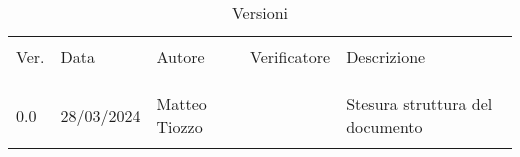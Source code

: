 \documentclass[italian,12pt]{article} %
\begin{document}


\newpage



\begin{table}[!h]
    \caption*{Versioni}
    \begin{center}
        \begin{tabular}{ l l l l p{9cm} }
            \hline                                                                                                          \\[-2ex]
            Ver. & Data       & Autore          & Verificatore              & Descrizione                                   \\
            \\[-2ex] \hline \\[-1.5ex]\\
            
            0.0  & 28/03/2024 & Matteo Tiozzo   &	                        & Stesura struttura del documento               \\
            \\[-1.5ex] \hline
        \end{tabular}
    \end{center}
\end{table}

\newpage

\tableofcontents

\newpage

\listoftables

\listoffigures

\newpage












\end{document}
